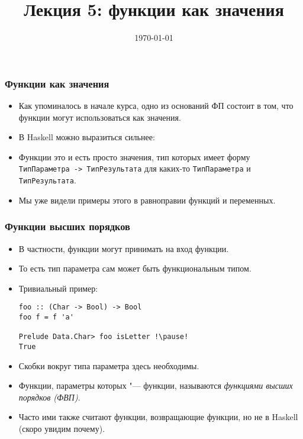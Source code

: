 \documentclass[10pt]{beamer}
\title{Лекция 5: функции как значения}
\date{\today}
\begin{document}
\begin{frame}[plain]
\maketitle
\end{frame}

\begin{frame}[fragile]
\frametitle{Функции как значения}
\begin{itemize}
    \item Как упоминалось в начале курса, одно из оснований ФП состоит в том, что функции могут использоваться как значения.
    \item В Haskell можно выразиться сильнее:\pause
    \item Функции это и есть просто значения, тип которых имеет форму \lstinline|ТипПараметра -> ТипРезультата| для каких-то \lstinline|ТипПараметра| и \lstinline|ТипРезультата|.\pause
    \item Мы уже видели примеры этого в равноправии функций и переменных.
\end{itemize}
\end{frame}

\begin{frame}[fragile]
\frametitle{Функции высших порядков}
\begin{itemize}
    \item В частности, функции могут принимать на вход функции.
    \item То есть тип параметра сам может быть функциональным типом. 
    \item Тривиальный пример:
\begin{lstlisting}
foo :: (Char -> Bool) -> Bool
foo f = f 'a'

Prelude Data.Char> foo isLetter !\pause!
True
\end{lstlisting} 
    \item Скобки вокруг типа параметра здесь необходимы.\pause
    \item Функции, параметры которых "--- функции, называются \emph{функциями высших порядков (ФВП)}.\pause
    \item Часто ими также считают функции, возвращающие функции, но не в Haskell (скоро увидим почему).
\end{itemize}
\end{frame}
\end{document}
